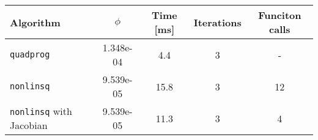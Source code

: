 \begin{tabular}{l|cccc} \hline \hline 
Algorithm & $\phi$ & Time [ms] & Iterations & Funciton calls  \\ \hline\texttt{quadprog} & 1.348e-04 & 4.4 & 3 & - \\ 
\texttt{nonlinsq} & 9.539e-05 & 15.8 & 3 & 12 \\ 
\texttt{nonlinsq} with Jacobian & 9.539e-05 & 11.3 & 3 & 4 \\ 
\hline \hline 
\end{tabular} 
